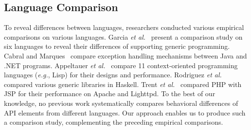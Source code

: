 \subsection{Language Comparison} To reveal differences between languages, researchers conducted various empirical comparisons on various languages. Garcia \emph{et al.}~\citep{Garcia2003} present a comparison study on six languages to reveal their differences of supporting generic programming. Cabral and Marques~\citep{cabral2007exception} compare exception handling mechanisms between Java and .NET programs. Appeltauer \emph{et al.}~\citep{appeltauer2009comparison} compare 11 context-oriented programming languages (\emph{e.g.}, Lisp) for their designs and performance. Rodriguez \emph{et al.}~\citep{yakushevcomparing} compared various generic libraries in Haskell. Trent \emph{et al.}~\citep{trent2008performance} compared PHP with JSP for their performance on Apache and Lighttpd. To the best of our knowledge, no previous work systematically compares behavioral differences of API elements from different languages. Our approach enables us to produce such a comparison study, complementing the preceding empirical comparisons.


